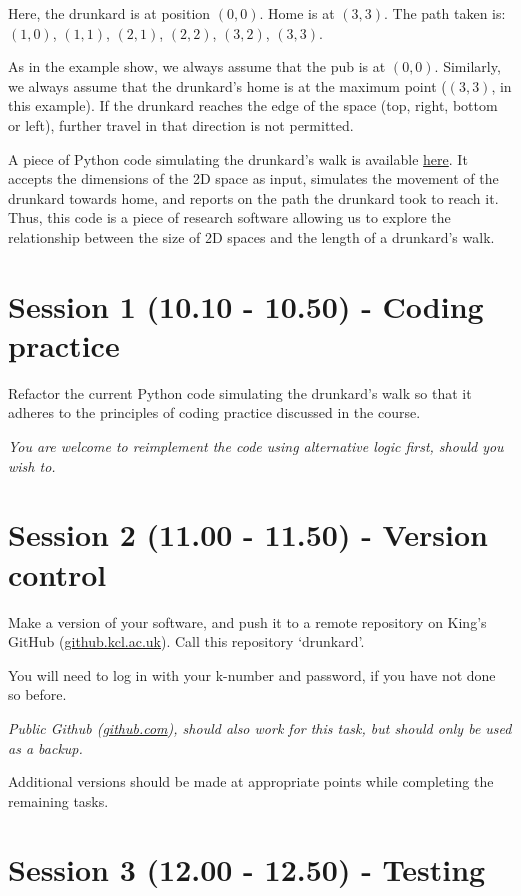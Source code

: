 \documentclass{article}
\begin{document}
Here, the drunkard is at position $(0, 0)$. 
Home is at $(3, 3)$. 
The path taken is: $(1, 0)$, $(1, 1)$, $(2, 1)$, $(2, 2)$, $(3, 2)$, $(3, 3)$.

As in the example show, we always assume that the pub is at $(0, 0)$.
Similarly, we always assume that the drunkard's home is at the maximum point ($(3, 3)$, in this example).
If the drunkard reaches the edge of the space (top, right, bottom or left), further travel in that direction is not permitted.

A piece of Python code simulating the drunkard's walk is available \href{https://github.com/martinteaching/sustainability/blob/master/workshops/kcl/2025/resources/drunkard.py}{here}.
It accepts the dimensions of the 2D space as input, simulates the movement of the drunkard towards home, and reports on the path the drunkard took to reach it.
Thus, this code is a piece of research software allowing us to explore the relationship between the size of 2D spaces and the length of a drunkard's walk.

\section{Session 1 (10.10 - 10.50) - Coding practice}

Refactor the current Python code simulating the drunkard's walk so that it adheres to the principles of coding practice discussed in the course.

\emph{You are welcome to reimplement the code using alternative logic first, should you wish to.}

\section{Session 2 (11.00 - 11.50) - Version control}

Make a version of your software, and push it to a remote repository on King's GitHub (\href{https://github.kcl.ac.uk/}{github.kcl.ac.uk}).
Call this repository `drunkard'.

You will need to log in with your k-number and password, if you have not done so before.

\textit{Public Github (\href{https://github.com}{github.com}), should
also work for this task, but should only be used as a backup.}

Additional versions should be made at appropriate points while completing the remaining tasks.

\section{Session 3 (12.00 - 12.50) - Testing}
\end{document}
